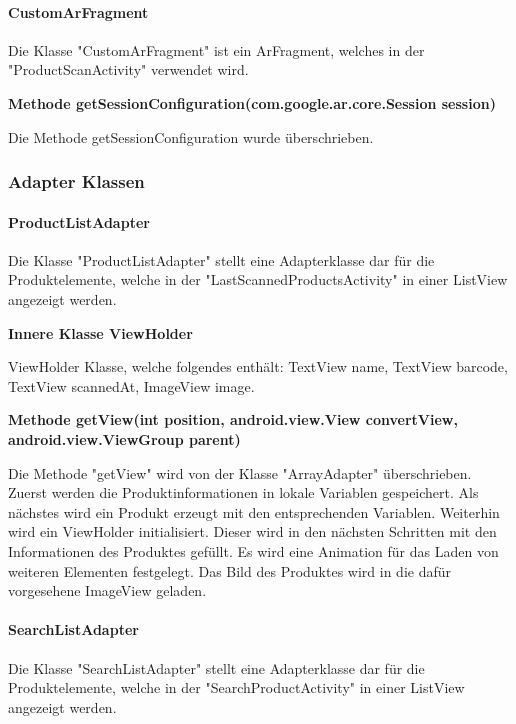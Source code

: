 \documentclass{scrartcl}
\begin{document}
\paragraph{CustomArFragment}
Die Klasse "CustomArFragment" ist ein ArFragment, welches in der "ProductScanActivity" verwendet wird. \newline 

\noindent\textbf{Methode getSessionConfiguration(com.google.ar.core.Session session)}

\noindent Die Methode getSessionConfiguration wurde überschrieben. \newline 

\subsubsection{Adapter Klassen}

\paragraph{ProductListAdapter}
Die Klasse "ProductListAdapter" stellt eine Adapterklasse dar für die Produktelemente, welche in der "LastScannedProductsActivity" in einer ListView angezeigt werden. \newline 

\noindent\textbf{Innere Klasse ViewHolder}

\noindent ViewHolder Klasse, welche folgendes enthält: TextView name, TextView barcode, TextView scannedAt, ImageView image. \newline 

\noindent\textbf{Methode getView(int position, \newline                                android.view.View convertView, android.view.ViewGroup parent)}

\noindent Die Methode "getView" wird von der Klasse "ArrayAdapter" überschrieben. Zuerst werden die Produktinformationen in lokale Variablen gespeichert. Als nächstes wird ein Produkt erzeugt mit den entsprechenden Variablen. Weiterhin wird ein ViewHolder initialisiert. Dieser wird in den nächsten Schritten mit den Informationen des Produktes gefüllt. Es wird eine Animation für das Laden von weiteren Elementen festgelegt. Das Bild des Produktes wird in die dafür vorgesehene ImageView geladen. \newline 

\paragraph{SearchListAdapter}
Die Klasse "SearchListAdapter" stellt eine Adapterklasse dar für die Produktelemente, welche in der "SearchProductActivity" in einer ListView angezeigt werden. \newline 
\end{document}
